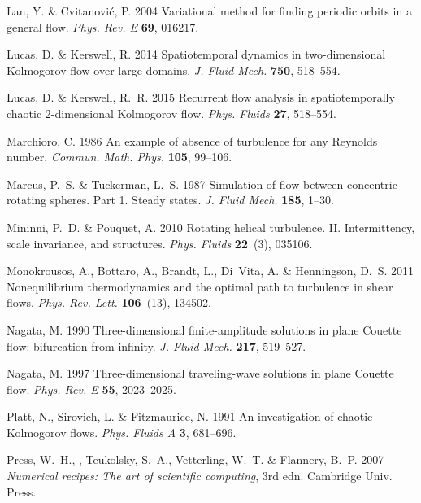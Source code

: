 \documentclass{jfm}
\begin{document}
\begin{thebibliography}{73}
{\sc Lan, Y. \& Cvitanovi\'{c}, P.} 2004 Variational method for finding
  periodic orbits in a general flow. {\em Phys. Rev. E\/} {\bf 69}, 016217.

{\sc Lucas, D. \& Kerswell, R.} 2014 Spatiotemporal dynamics in two-dimensional
  {Kolmogorov} flow over large domains. {\em J. Fluid Mech.\/} {\bf 750},
  518--554.

{\sc Lucas, D. \& Kerswell, R.~R.} 2015 Recurrent flow analysis in
  spatiotemporally chaotic 2-dimensional {Kolmogorov} flow. {\em Phys.
  Fluids\/} {\bf 27}, 518--554.

{\sc Marchioro, C.} 1986 An example of absence of turbulence for any {Reynolds}
  number. {\em Commun. Math. Phys.\/} {\bf 105}, 99--106.

{\sc Marcus, P.~S. \& Tuckerman, L.~S.} 1987 Simulation of flow between
  concentric rotating spheres. {P}art 1. {Steady} states. {\em J. Fluid
  Mech.\/} {\bf 185}, 1--30.

{\sc Mininni, P.~D. \& Pouquet, A.} 2010 Rotating helical turbulence. {II}.
  {Intermittency}, scale invariance, and structures. {\em Phys. Fluids\/} {\bf
  22}~(3), 035106.

{\sc Monokrousos, A., Bottaro, A., Brandt, L., Di~Vita, A. \& Henningson,
  D.~S.} 2011 Nonequilibrium thermodynamics and the optimal path to turbulence
  in shear flows. {\em Phys. Rev. Lett.\/} {\bf 106}~(13), 134502.

{\sc Nagata, M.} 1990 Three-dimensional finite-amplitude solutions in plane
  {C}ouette flow: bifurcation from infinity. {\em J. Fluid Mech.\/} {\bf 217},
  519--527.

{\sc Nagata, M.} 1997 Three-dimensional traveling-wave solutions in plane
  {C}ouette flow. {\em Phys. Rev. E\/} {\bf 55}, 2023--2025.

{\sc Platt, N., Sirovich, L. \& Fitzmaurice, N.} 1991 An investigation of
  chaotic {Kolmogorov} flows. {\em Phys. Fluids A\/} {\bf 3}, 681--696.

{\sc Press, W.~H., , Teukolsky, S.~A., Vetterling, W.~T. \& Flannery, B.~P.}
  2007 {\em Numerical recipes: {T}he art of scientific computing\/}, 3rd edn.
  Cambridge Univ. Press.


\end{thebibliography}
\end{document}
